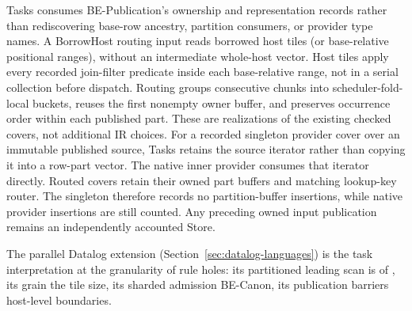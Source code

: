 Tasks consumes BE-Publication's ownership and representation records rather
than rediscovering base-row ancestry, partition consumers, or provider type
names. A BorrowHost routing input reads borrowed host tiles (or base-relative
positional ranges), without an intermediate whole-host vector. Host tiles
apply every recorded join-filter predicate inside each base-relative range,
not in a serial collection before dispatch. Routing groups consecutive chunks
into scheduler-fold-local buckets, reuses the first nonempty owner buffer,
and preserves occurrence order within each published part. These are
realizations of the existing checked covers, not additional IR choices.
For a recorded singleton provider cover over an immutable published source,
Tasks retains the source iterator rather than copying it into a row-part
vector. The native inner provider consumes that iterator directly. Routed
covers retain their owned part buffers and matching lookup-key router.
The singleton therefore records no partition-buffer insertions, while native
provider insertions are still counted. Any preceding owned input publication
remains an independently accounted Store.

The parallel Datalog extension (Section~\ref{sec:datalog-languages}) is the
task interpretation at the granularity of rule holes: its partitioned
leading scan is  of , its grain the tile size, its
sharded admission BE-Canon, its publication barriers host-level
boundaries.

